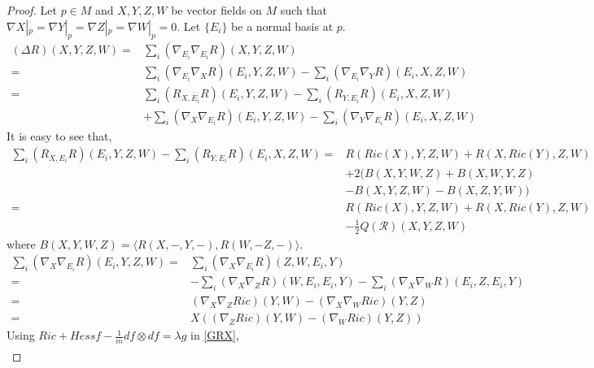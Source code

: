 \documentclass[10pt,a4paper]{amsart}
\begin{document}
\begin{proof}
    Let $p \in M$ and $X,Y,Z,W$ be vector fields on $M$ such that $\nabla X|_{p} = \nabla Y|_{p} = \nabla Z|_{p} = \nabla W|_{p} = 0$. Let $\{E_{i}\}$ be a normal basis at $p$.
    {\small
    \begin{align}\label{LRE}
        (\Delta R)(X,Y,Z,W)=&\sum_{i}(\nabla_{E_{i}}\nabla_{E_{i}}R)(X,Y,Z,W)\nonumber\\=&\sum_{i}(\nabla_{E_{i}}\nabla_{X}R)(E_{i},Y,Z,W) - \sum_{i}(\nabla_{E_{i}}\nabla_{Y}R)(E_{i},X,Z,W)\nonumber\\=&\sum_{i}(R_{X,E_{i}}R)(E_{i},Y,Z,W) - \sum_{i}(R_{Y,E_{i}}R)(E_{i},X,Z,W)\nonumber\\&+ \sum_{i}(\nabla_{X}\nabla_{E_{i}}R)(E_{i},Y,Z,W) - \sum_{i}(\nabla_{Y}\nabla_{E_{i}}R)(E_{i},X,Z,W)
    \end{align}}
    It is easy to see that,
{\small
    \begin{align}\label{CCE}
    \sum_{i}(R_{X,E_{i}}R)(E_{i},Y,Z,W) - \sum_{i}(R_{Y,E_{i}}R)(E_{i},X,Z,W)=& R(Ric(X),Y,Z,W) + R(X,Ric(Y),Z,W)\nonumber\\
    &+ 2(B(X,Y,W,Z) + B(X,W,Y,Z) \nonumber\\& - B(X,Y,Z,W) - B(X,Z,Y,W))\nonumber\\=& R(Ric(X),Y,Z,W) + R(X,Ric(Y),Z,W)\nonumber\\&-\frac{1}{2}Q(\mathcal{R})(X,Y,Z,W)
    \end{align}}
    where $B(X,Y,W,Z) = \langle R(X,-,Y,-),R(W,-Z,-)\rangle$.
    {\small
    \begin{align}\label{GRX}
        \sum_{i}(\nabla_{X}\nabla_{E_{i}}R)(E_{i},Y,Z,W) =&\sum_{i}(\nabla_{X}\nabla_{E_{i}}R)(Z,W,E_{i},Y)\nonumber\\=&-\sum_{i}(\nabla_{X}\nabla_{Z}R)(W,E_{i},E_{i},Y)-\sum_{i}(\nabla_{X}\nabla_{W}R)(E_{i},Z,E_{i},Y)\nonumber\\=&(\nabla_{X}\nabla_{Z}Ric)(Y,W) - (\nabla_{X}\nabla_{W}Ric)(Y,Z)\nonumber\\=& X((\nabla_{Z}Ric)(Y,W)- (\nabla_{W}Ric)(Y,Z))
    \end{align}}
Using $Ric + Hessf - \frac{1}{m}df \otimes df = \lambda g$ in \cref{GRX},
{\small
\begin{align}\label{GRXSE}

\end{align}}
\end{proof}
\end{document}
